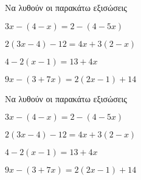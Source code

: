 Να λυθούν οι παρακάτω εξισώσεις
\begin{alist}
\item $ 3x-(4-x)=2-(4-5x) $
\item $ 2(3x-4)-12=4x+3(2-x) $
\item $ 4-2(x-1)=13+4x $
\item $ 9x-(3+7x)=2(2x-1)+14 $
\end{alist}
Να λυθούν οι παρακάτω εξισώσεις
\begin{alist}
\item $ 3x-(4-x)=2-(4-5x) $
\item $ 2(3x-4)-12=4x+3(2-x) $
\item $ 4-2(x-1)=13+4x $
\item $ 9x-(3+7x)=2(2x-1)+14 $
\end{alist}
